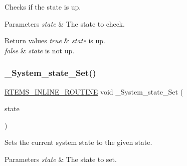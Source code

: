 Checks if the state is up. 


\begin{DoxyParams}{Parameters}
{\em state} & The state to check.\\
\hline
\end{DoxyParams}

\begin{DoxyRetVals}{Return values}
{\em true} & {\itshape state} is up. \\
\hline
{\em false} & {\itshape state} is not up. \\
\hline
\end{DoxyRetVals}
\mbox{\label{group__RTEMSScoreSysState_gae619801bab42e4e750981529d3f41960}} 
\subsubsection{\texorpdfstring{\_System\_state\_Set()}{\_System\_state\_Set()}}
{\footnotesize\ttfamily \mbox{\hyperlink{group__RTEMSScoreBaseDefs_gac216239df231d5dbd15e3520b0b9313f}{R\+T\+E\+M\+S\+\_\+\+I\+N\+L\+I\+N\+E\+\_\+\+R\+O\+U\+T\+I\+NE}} void \+\_\+\+System\+\_\+state\+\_\+\+Set (\begin{DoxyParamCaption}\item[{\mbox{\hyperlink{group__RTEMSScoreSysState_ga959824776c35a999ecd2720fde987d72}{System\+\_\+state\+\_\+\+Codes}}}]{state }\end{DoxyParamCaption})}



Sets the current system state to the given state. 


\begin{DoxyParams}{Parameters}
{\em state} & The state to set. \\
\hline
\end{DoxyParams}
